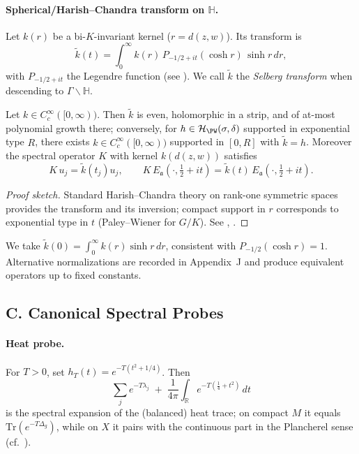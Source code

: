 \paragraph{Spherical/Harish–Chandra transform on $\mathbb H$.}
Let $k(r)$ be a bi-$K$-invariant kernel ($r=d(z,w)$). Its transform is
\[
  \widetilde k(t)=\int_0^\infty k(r)\,P_{-1/2+it}(\cosh r)\,\sinh r\,dr,
\]
with $P_{-1/2+it}$ the Legendre function (see \cite{HelgasonGGA}). We call $\widetilde k$ the \emph{Selberg transform} when descending to $\Gamma\backslash\mathbb H$.

\begin{theorem}
\label{thm:selberg-transform}
Let $k\in C_c^\infty([0,\infty))$. Then $\widetilde k$ is even, holomorphic in a strip, and of at-most polynomial growth there; conversely, for $h\in\mathcal H_{\PW}(\sigma,\delta)$ supported in exponential type $R$, there exists $k\in C_c^\infty([0,\infty))$ supported in $[0,R]$ with $\widetilde k=h$. Moreover the spectral operator $K$ with kernel $k(d(z,w))$ satisfies
\[
  K\,u_j=\widetilde k(t_j)u_j,\qquad
  K\,E_{\mathfrak a}(\cdot,\tfrac12+it)=\widetilde k(t)\,E_{\mathfrak a}(\cdot,\tfrac12+it).
\]
\end{theorem}

\begin{proof}[Proof sketch]
Standard Harish–Chandra theory on rank-one symmetric spaces provides the transform and its inversion; compact support in $r$ corresponds to exponential type in $t$ (Paley–Wiener for $G/K$). See \cite[Ch.~IV,V]{HelgasonGGA}, \cite[§2]{Hejhal1983}.
\end{proof}

\begin{remark}[Audit: kernel normalization at $t=0$]
We take $\widetilde k(0)=\int_0^\infty k(r)\sinh r\,dr$, consistent with $P_{-1/2}( \cosh r)=1$. Alternative normalizations are recorded in Appendix~J and produce equivalent operators up to fixed constants.
\end{remark}


\subsection*{C. Canonical Spectral Probes}
\label{subsec:probes}

\paragraph{Heat probe.}
For $T>0$, set $h_T(t)=e^{-T(t^2+1/4)}$. Then
\[
  \sum_j e^{-T\lambda_j} \;+\; \frac{1}{4\pi}\int_{\mathbb R} e^{-T(\tfrac14+t^2)}\,dt
\]
is the spectral expansion of the (balanced) heat trace; on compact $M$ it equals $\mathrm{Tr}(e^{-T\Delta_g})$, while on $X$ it pairs with the continuous part in the Plancherel sense (cf.\ \cite{Seeley1967,Minakshisundaram1949}).

